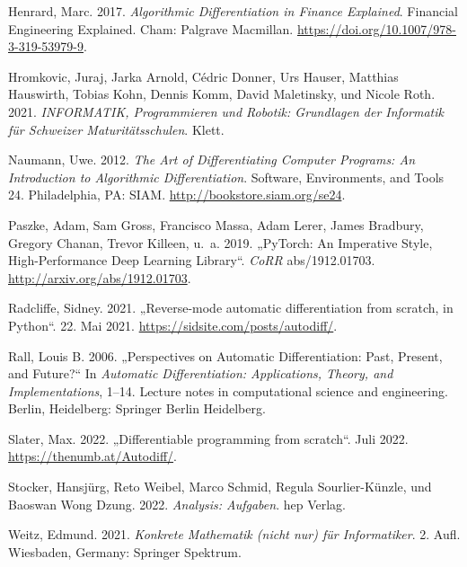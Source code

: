 \documentclass[
  a4paper,
  DIV=11]{scrreprt}
\newlength{\cslhangindent}
\newlength{\cslentryspacingunit} %
\newenvironment{CSLReferences}[2] %
 {%
  \setlength{\parindent}{0pt}
  \ifodd #1
  \let\oldpar\par
  \def\par{\hangindent=\cslhangindent\oldpar}
  \fi
  \setlength{\parskip}{#2\cslentryspacingunit}
 }%
 {}
\theoremstyle{definition}
\theoremstyle{definition}
\theoremstyle{remark}
\begin{document}
\begin{CSLReferences}{1}{0}
\leavevmode{}%
Henrard, Marc. 2017. \emph{Algorithmic Differentiation in Finance
Explained}. Financial Engineering Explained. Cham: Palgrave Macmillan.
\url{https://doi.org/10.1007/978-3-319-53979-9}.

\leavevmode{}%
Hromkovic, Juraj, Jarka Arnold, Cédric Donner, Urs Hauser, Matthias
Hauswirth, Tobias Kohn, Dennis Komm, David Maletinsky, und Nicole Roth.
2021. \emph{{INFORMATIK}, Programmieren und Robotik: Grundlagen der
Informatik f{ü}r Schweizer Maturit{ä}tsschulen}. Klett.

\leavevmode{}%
Naumann, Uwe. 2012. \emph{The Art of Differentiating Computer Programs:
{A}n Introduction to Algorithmic Differentiation}. Software,
Environments, and Tools 24. Philadelphia, PA: SIAM.
\url{http://bookstore.siam.org/se24}.

\leavevmode{}%
Paszke, Adam, Sam Gross, Francisco Massa, Adam Lerer, James Bradbury,
Gregory Chanan, Trevor Killeen, u.~a. 2019. {„PyTorch: An Imperative
Style, High-Performance Deep Learning Library``}. \emph{CoRR}
abs/1912.01703. \url{http://arxiv.org/abs/1912.01703}.

\leavevmode{}%
Radcliffe, Sidney. 2021. {„Reverse-mode automatic differentiation from
scratch, in Python``}. 22. Mai 2021.
\url{https://sidsite.com/posts/autodiff/}.

\leavevmode{}%
Rall, Louis B. 2006. {„Perspectives on Automatic Differentiation: Past,
Present, and Future?``} In \emph{Automatic Differentiation:
Applications, Theory, and Implementations}, 1--14. Lecture notes in
computational science and engineering. Berlin, Heidelberg: Springer
Berlin Heidelberg.

\leavevmode{}%
Slater, Max. 2022. {„Differentiable programming from scratch``}. Juli
2022. \url{https://thenumb.at/Autodiff/}.

\leavevmode{}%
Stocker, Hansjürg, Reto Weibel, Marco Schmid, Regula Sourlier-Künzle,
und Baoswan Wong Dzung. 2022. \emph{Analysis: Aufgaben}. hep Verlag.

\leavevmode{}%
Weitz, Edmund. 2021. \emph{Konkrete Mathematik (nicht nur) f{ü}r
Informatiker}. 2. Aufl. Wiesbaden, Germany: Springer Spektrum.

\end{CSLReferences}
\end{document}
